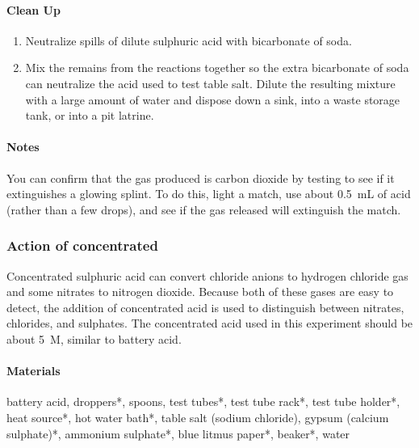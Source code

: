 \paragraph{Clean Up}
\begin{enumerate}
\item{Neutralize spills of dilute sulphuric acid with bicarbonate of soda.}
\item{Mix the remains from the reactions together so the extra bicarbonate of soda can neutralize the acid used to test table salt. Dilute the resulting mixture with a large amount of water and dispose down a sink, into a waste storage tank, or into a pit latrine.}
\end{enumerate}

\paragraph{Notes}
You can confirm that the gas produced is carbon dioxide by testing to see if it extinguishes a glowing splint. To do this, light a match, use about 0.5~mL of acid (rather than a few drops), and see if the gas released will extinguish the match.

\subsubsection{Action of concentrated \texorpdfstring{}{H2SO4}}

Concentrated sulphuric acid can convert chloride anions to hydrogen chloride gas and some nitrates to nitrogen dioxide. Because both of these gases are easy to detect, the addition of concentrated acid is used to distinguish between nitrates, chlorides, and sulphates. The concentrated acid used in this experiment should be about 5~M, similar to battery acid.

\paragraph{Materials}
battery acid, droppers*, spoons, test tubes*, test tube rack*, test tube holder*, heat source*, hot water bath*, table salt (sodium chloride), gypsum (calcium sulphate)*, ammonium sulphate*, blue litmus paper*, beaker*, water

